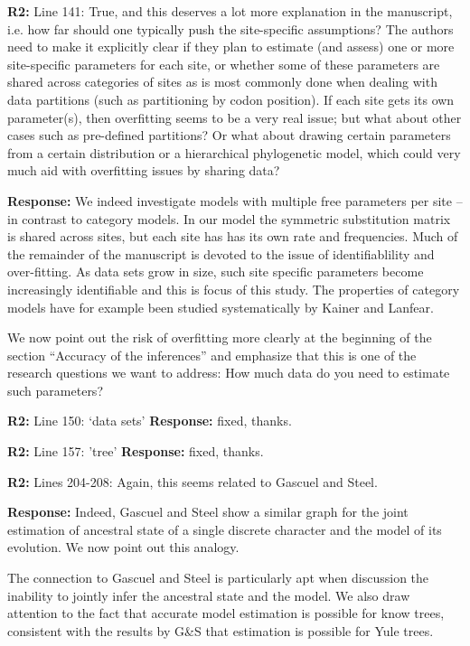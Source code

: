 \documentclass[aps,rmp,onecolumn]{revtex4-1}
\newcommand{\refb}[1]{\textbf{R2:} #1}
\newcommand{\response}[1]{{\color{black}\textbf{Response:} #1}}
\begin{document}
\refb{Line 141: True, and this deserves a lot more explanation in the manuscript, i.e. how far should one typically push the site-specific assumptions? The authors need to make it explicitly clear if they plan to estimate (and assess) one or more site-specific parameters for each site, or whether some of these parameters are shared across categories of sites as is most commonly done when dealing with data partitions (such as partitioning by codon position). If each site gets its own parameter(s), then overfitting seems to be a very real issue; but what about other cases such as pre-defined partitions? Or what about drawing certain parameters from a certain distribution or a hierarchical phylogenetic model, which could very much aid with overfitting issues by sharing data?}

\response{We indeed investigate models with multiple free parameters per site -- in contrast to category models.
In our model the symmetric substitution matrix is shared across sites, but each site has has its own rate and frequencies.
Much of the remainder of the manuscript is devoted to the issue of identifiablility and over-fitting.
As data sets grow in size, such site specific parameters become increasingly identifiable and this is focus of this study.
The properties of category models have for example been studied systematically by Kainer and Lanfear.

We now point out the risk of overfitting more clearly at the beginning of the section ``Accuracy of the inferences'' and emphasize that this is one of the research questions we want to address: How much data do you need to estimate such parameters?
}


\refb{Line 150: `data sets'}
\response{fixed, thanks.}

\refb{Line 157: 'tree'}
\response{fixed, thanks.}

\refb{Lines 204-208: Again, this seems related to Gascuel and Steel.}

\response{Indeed, Gascuel and Steel show a similar graph for the joint estimation of ancestral state of a single discrete character and the model of its evolution. We now point out this analogy.

The connection to Gascuel and Steel is particularly apt when discussion the inability to jointly infer the ancestral state and the model.
We also draw attention to the fact that accurate model estimation is possible for know trees, consistent with the results by G\&S that estimation is possible for Yule trees.
}
\end{document}

